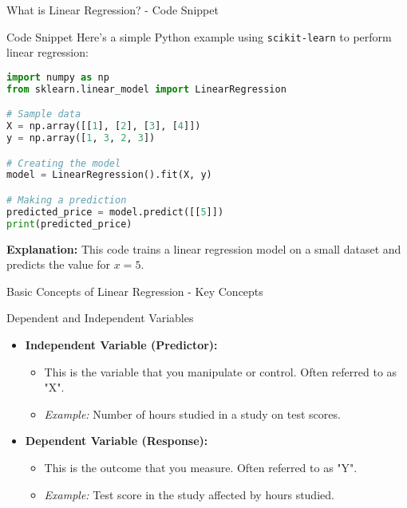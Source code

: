 \documentclass[aspectratio=169]{beamer}
\begin{document}
\begin{frame}[fragile]{What is Linear Regression? - Code Snippet}
    \begin{block}{Code Snippet}
        Here’s a simple Python example using \texttt{scikit-learn} to perform linear regression:
        \begin{lstlisting}[language=Python]
import numpy as np
from sklearn.linear_model import LinearRegression

# Sample data
X = np.array([[1], [2], [3], [4]])
y = np.array([1, 3, 2, 3])

# Creating the model
model = LinearRegression().fit(X, y)

# Making a prediction
predicted_price = model.predict([[5]])
print(predicted_price)
        \end{lstlisting}
        \textbf{Explanation:} This code trains a linear regression model on a small dataset and predicts the value for \(x = 5\).
    \end{block}
\end{frame}

\begin{frame}[fragile]{Basic Concepts of Linear Regression - Key Concepts}
    \begin{block}{Dependent and Independent Variables}
        \begin{itemize}
            \item \textbf{Independent Variable (Predictor):}
            \begin{itemize}
                \item This is the variable that you manipulate or control. Often referred to as "X".
                \item \textit{Example:} Number of hours studied in a study on test scores.
            \end{itemize}
            \item \textbf{Dependent Variable (Response):}
            \begin{itemize}
                \item This is the outcome that you measure. Often referred to as "Y".
                \item \textit{Example:} Test score in the study affected by hours studied.
            \end{itemize}
        \end{itemize}
    \end{block}
\end{frame}
\end{document}
